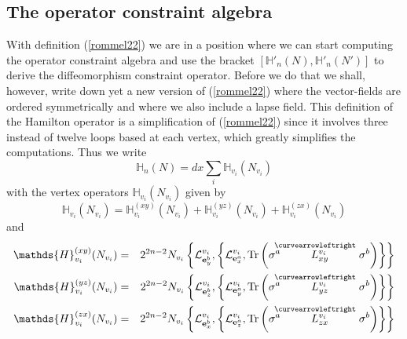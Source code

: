 \documentclass[12pt]{article}
\newcommand{\nn}{\nonumber}
\def\cl{{\cal L}}
\begin{document}





















\subsection{The operator constraint algebra}

With definition (\ref{rommel22}) we are in a position where we can start computing the operator constraint algebra and use the bracket $[\mathds{H}'_n(N),\mathds{H}'_n(N')]$ to derive the diffeomorphism constraint operator. Before we do that we shall, however, write down yet a new version of (\ref{rommel22}) where the vector-fields are ordered symmetrically and where we also include a lapse field. This definition of the Hamilton operator is a simplification of (\ref{rommel22}) since it involves three instead of twelve loops based at each vertex, which greatly simplifies the computations.
%
Thus we write
\begin{equation}
\mathds{H}_n(N)= dx \sum_{i} \mathds{H}_{v_i}(N_{v_i})
\label{AGW}
\end{equation}
with the vertex operators $\mathds{H}_{v_i}(N_{v_i})$ given by 
$$
 \mathds{H}_{v_i}(N_{v_i}) =     \mathds{H}^{(xy)}_{v_i}(N_{v_i}) + \mathds{H}^{(yz)}_{v_i}(N_{v_i}) + \mathds{H}^{(zx)}_{v_i}(N_{v_i})     
$$
and %
\begin{eqnarray}
 \mathds{H}^{(xy)}_{v_i}(N_{v_i}) 
 &=& 2^{2n-2}  N_{v_i}  \left\{ \cl^{v_i}_{{\bf e}^b_y} , \left\{ \cl^{v_i}_{{\bf e}^a_x}  , \mbox{Tr} \left( \sigma^a  \stackrel{\hspace{-3mm}\curvearrowleftright}{L^{v_i}_{xy}}       \sigma^b   \right) \right\} \right\}
 \nn\\
  \mathds{H}^{(yz)}_{v_i}(N_{v_i}) 
  &=& 2^{2n-2}  N_{v_i}  \left\{ \cl^{v_i}_{{\bf e}^b_z} , \left\{ \cl^{v_i}_{{\bf e}^a_y}  , \mbox{Tr} \left( \sigma^a  \stackrel{\hspace{-3mm}\curvearrowleftright}{L^{v_i}_{yz}}       \sigma^b   \right) \right\} \right\}
 \nn\\
  \mathds{H}^{(zx)}_{v_i}(N_{v_i}) 
  &=& 2^{2n-2}  N_{v_i}  \left\{ \cl^{v_i}_{{\bf e}^b_x} , \left\{ \cl^{v_i}_{{\bf e}^a_z}  , \mbox{Tr} \left( \sigma^a  \stackrel{\hspace{-3mm}\curvearrowleftright}{L^{v_i}_{zx}}       \sigma^b   \right) \right\} \right\}
 \label{symmm}
\end{eqnarray}
\end{document}
